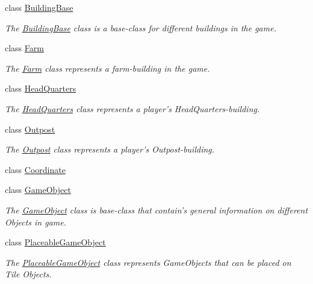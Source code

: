 \begin{DoxyCompactItemize}
\item 
class \hyperlink{classCourse_1_1BuildingBase}{Building\-Base}
\begin{DoxyCompactList}\small\item\em The \hyperlink{classCourse_1_1BuildingBase}{Building\-Base} class is a base-\/class for different buildings in the game. \end{DoxyCompactList}\item 
class \hyperlink{classCourse_1_1Farm}{Farm}
\begin{DoxyCompactList}\small\item\em The \hyperlink{classCourse_1_1Farm}{Farm} class represents a farm-\/building in the game. \end{DoxyCompactList}\item 
class \hyperlink{classCourse_1_1HeadQuarters}{Head\-Quarters}
\begin{DoxyCompactList}\small\item\em The \hyperlink{classCourse_1_1HeadQuarters}{Head\-Quarters} class represents a player's Head\-Quarters-\/building. \end{DoxyCompactList}\item 
class \hyperlink{classCourse_1_1Outpost}{Outpost}
\begin{DoxyCompactList}\small\item\em The \hyperlink{classCourse_1_1Outpost}{Outpost} class represents a player's Outpost-\/building. \end{DoxyCompactList}\item 
class \hyperlink{classCourse_1_1Coordinate}{Coordinate}
\item 
class \hyperlink{classCourse_1_1GameObject}{Game\-Object}
\begin{DoxyCompactList}\small\item\em The \hyperlink{classCourse_1_1GameObject}{Game\-Object} class is base-\/class that contain's general information on different Objects in game. \end{DoxyCompactList}\item 
class \hyperlink{classCourse_1_1PlaceableGameObject}{Placeable\-Game\-Object}
\begin{DoxyCompactList}\small\item\em The \hyperlink{classCourse_1_1PlaceableGameObject}{Placeable\-Game\-Object} class represents Game\-Objects that can be placed on Tile Objects. \end{DoxyCompactList}\item 

\end{DoxyCompactItemize}
